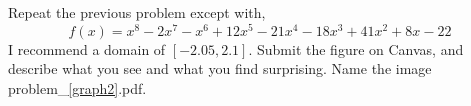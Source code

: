 \documentclass[11pt,letterpaper]{article}
\begin{document}
\begin{problem}
\label{graph2}
 Repeat the previous problem except with,
\[
f(x) = x^8-2x^7-x^6+12x^5-21x^4-18x^3+41x^2+8x-22
\]
I recommend a domain of $[-2.05,2.1]$. 
Submit the figure on Canvas, and describe what you see and what you find surprising. Name the 
image problem\_\ref{graph2}.pdf.
\end{problem}
\end{document}

